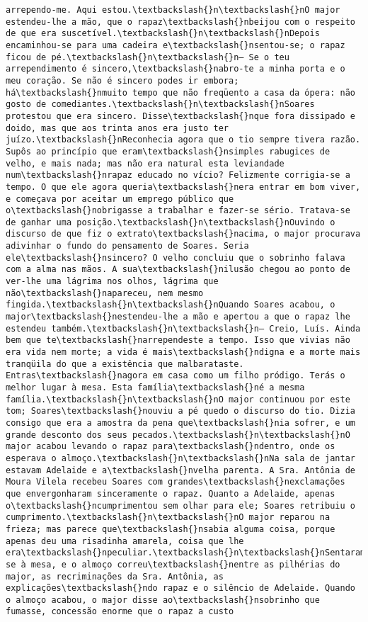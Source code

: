 \documentclass[11pt]{article}
\begin{document}
\begin{Verbatim}[commandchars=\\\{\}]
arrependo-me. Aqui estou.\textbackslash{}n\textbackslash{}nO major estendeu-lhe a mão, que o rapaz\textbackslash{}nbeijou com o respeito de que era suscetível.\textbackslash{}n\textbackslash{}nDepois encaminhou-se para uma cadeira e\textbackslash{}nsentou-se; o rapaz ficou de pé.\textbackslash{}n\textbackslash{}n— Se o teu arrependimento é sincero,\textbackslash{}nabro-te a minha porta e o meu coração. Se não é sincero podes ir embora; há\textbackslash{}nmuito tempo que não freqüento a casa da ópera: não gosto de comediantes.\textbackslash{}n\textbackslash{}nSoares protestou que era sincero. Disse\textbackslash{}nque fora dissipado e doido, mas que aos trinta anos era justo ter juízo.\textbackslash{}nReconhecia agora que o tio sempre tivera razão. Supôs ao princípio que eram\textbackslash{}nsimples rabugices de velho, e mais nada; mas não era natural esta leviandade num\textbackslash{}nrapaz educado no vício? Felizmente corrigia-se a tempo. O que ele agora queria\textbackslash{}nera entrar em bom viver, e começava por aceitar um emprego público que o\textbackslash{}nobrigasse a trabalhar e fazer-se sério. Tratava-se de ganhar uma posição.\textbackslash{}n\textbackslash{}nOuvindo o discurso de que fiz o extrato\textbackslash{}nacima, o major procurava adivinhar o fundo do pensamento de Soares. Seria ele\textbackslash{}nsincero? O velho concluiu que o sobrinho falava com a alma nas mãos. A sua\textbackslash{}nilusão chegou ao ponto de ver-lhe uma lágrima nos olhos, lágrima que não\textbackslash{}napareceu, nem mesmo fingida.\textbackslash{}n\textbackslash{}nQuando Soares acabou, o major\textbackslash{}nestendeu-lhe a mão e apertou a que o rapaz lhe estendeu também.\textbackslash{}n\textbackslash{}n— Creio, Luís. Ainda bem que te\textbackslash{}narrependeste a tempo. Isso que vivias não era vida nem morte; a vida é mais\textbackslash{}ndigna e a morte mais tranqüila do que a existência que malbarataste. Entras\textbackslash{}nagora em casa como um filho pródigo. Terás o melhor lugar à mesa. Esta família\textbackslash{}né a mesma família.\textbackslash{}n\textbackslash{}nO major continuou por este tom; Soares\textbackslash{}nouviu a pé quedo o discurso do tio. Dizia consigo que era a amostra da pena que\textbackslash{}nia sofrer, e um grande desconto dos seus pecados.\textbackslash{}n\textbackslash{}nO major acabou levando o rapaz para\textbackslash{}ndentro, onde os esperava o almoço.\textbackslash{}n\textbackslash{}nNa sala de jantar estavam Adelaide e a\textbackslash{}nvelha parenta. A Sra. Antônia de Moura Vilela recebeu Soares com grandes\textbackslash{}nexclamações que envergonharam sinceramente o rapaz. Quanto a Adelaide, apenas o\textbackslash{}ncumprimentou sem olhar para ele; Soares retribuiu o cumprimento.\textbackslash{}n\textbackslash{}nO major reparou na frieza; mas parece que\textbackslash{}nsabia alguma coisa, porque apenas deu uma risadinha amarela, coisa que lhe era\textbackslash{}npeculiar.\textbackslash{}n\textbackslash{}nSentaram-se à mesa, e o almoço correu\textbackslash{}nentre as pilhérias do major, as recriminações da Sra. Antônia, as explicações\textbackslash{}ndo rapaz e o silêncio de Adelaide. Quando o almoço acabou, o major disse ao\textbackslash{}nsobrinho que fumasse, concessão enorme que o rapaz a custo 
\end{Verbatim}
\end{document}
